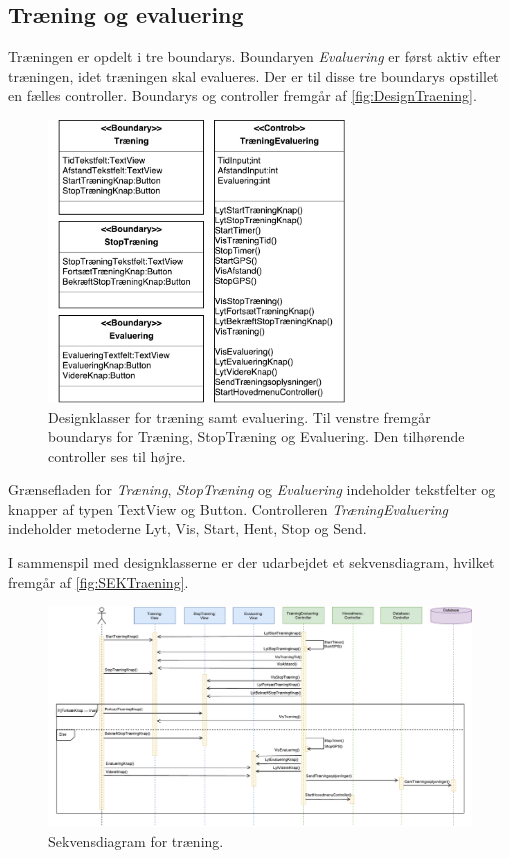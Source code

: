 \subsection*{Træning og evaluering}
Træningen er opdelt i tre boundarys. Boundaryen \textit{Evaluering} er først aktiv efter træningen, idet træningen skal evalueres. Der er til disse tre boundarys opstillet en fælles controller. Boundarys og controller fremgår af \autoref{fig:DesignTraening}. 

\begin{figure} [H]
\centering
\includegraphics[width=0.7\textwidth]{figures/MVC/MVCTraening}
\caption{Designklasser for træning samt evaluering. Til venstre fremgår boundarys for Træning, StopTræning og Evaluering. Den tilhørende controller ses til højre.}
\label{fig:DesignTraening}
\end{figure}

\noindent
Grænsefladen for \textit{Træning}, \textit{StopTræning} og \textit{Evaluering} indeholder tekstfelter og knapper af typen TextView og Button. Controlleren \textit{TræningEvaluering} indeholder metoderne Lyt, Vis, Start, Hent, Stop og Send. 

I sammenspil med designklasserne er der udarbejdet et sekvensdiagram, hvilket fremgår af \autoref{fig:SEKTraening}. 

\begin{figure} [H]
\centering
\includegraphics[width=1.55\textwidth, angle=90]{figures/Sek/SEKTraening}
\caption{Sekvensdiagram for træning.}
\label{fig:SEKTraening}
\end{figure}

